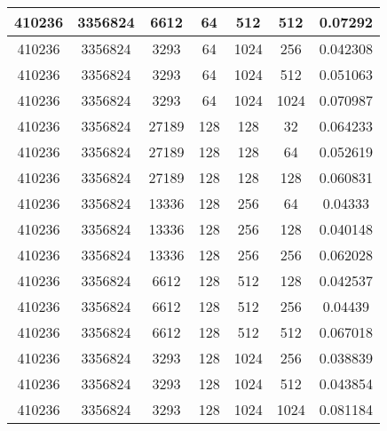 \documentclass[9pt]{article}
\begin{document}
\begin{tabular}{|c|c|c|c|c|c|c| }
\hline
410236  & 3356824  & 6612  & 64  & 512  & 512  & 0.07292 \\
\hline
410236  & 3356824  & 3293  & 64  & 1024  & 256  & 0.042308 \\
\hline
410236  & 3356824  & 3293  & 64  & 1024  & 512  & 0.051063 \\
\hline
410236  & 3356824  & 3293  & 64  & 1024  & 1024  & 0.070987 \\
\hline
410236  & 3356824  & 27189  & 128  & 128  & 32  & 0.064233 \\
\hline
410236  & 3356824  & 27189  & 128  & 128  & 64  & 0.052619 \\
\hline
410236  & 3356824  & 27189  & 128  & 128  & 128  & 0.060831 \\
\hline
410236  & 3356824  & 13336  & 128  & 256  & 64  & 0.04333 \\
\hline
410236  & 3356824  & 13336  & 128  & 256  & 128  & 0.040148 \\
\hline
410236  & 3356824  & 13336  & 128  & 256  & 256  & 0.062028 \\
\hline
410236  & 3356824  & 6612  & 128  & 512  & 128  & 0.042537 \\
\hline
410236  & 3356824  & 6612  & 128  & 512  & 256  & 0.04439 \\
\hline
410236  & 3356824  & 6612  & 128  & 512  & 512  & 0.067018 \\
\hline
410236  & 3356824  & 3293  & 128  & 1024  & 256  & 0.038839 \\
\hline
410236  & 3356824  & 3293  & 128  & 1024  & 512  & 0.043854 \\
\hline
410236  & 3356824  & 3293  & 128  & 1024  & 1024  & 0.081184 \\
\hline
\end{tabular}
 
\end{document}
